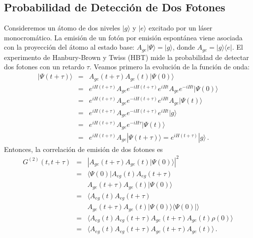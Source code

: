 \documentclass[twocolumn,aps,eqsecnum,showkeys,amsmath]{revtex4}
\begin{document}
\subsection{Probabilidad de Detecci\'on de Dos Fotones} %
Consideremos un \'atomo de dos niveles $|g\rangle$ y $|e\rangle$ 
excitado por un l\'aser monocrom\'atico. La emisi\'on de un fot\'on por 
emisi\'on espont\'anea viene asociada con la proyecci\'on del \'atomo al 
estado base: $A_{ge} |\Psi \rangle =|g\rangle$, donde 
$A_{ge} = |g \rangle \langle e|$. El experimento de Hanbury-Brown y 
Twiss (HBT) mide la probabilidad de detectar dos fotones con un retardo 
$\tau$. Veamos primero la evoluci\'on de la funci\'on de onda: 
%
\begin{eqnarray*}  	%
|\Psi(t+\tau) \rangle &=& A_{ge} (t+\tau) A_{ge} (t) |\Psi (0) \rangle  	\\
	&=& e^{iH(t+\tau)} A_{ge} e^{-iH(t+\tau)} e^{iHt} A_{ge} e^{-iHt} 
		|\Psi (0) \rangle \\ 
&=& e^{iH(t+\tau)} A_{ge} e^{-iH(t+\tau)} e^{iHt} A_{ge} |\Psi (t) \rangle \\ 
&=& e^{iH(t+\tau)} A_{ge} e^{-iH(t+\tau)} e^{iHt} |g \rangle \\ 
&=& e^{iH(t+\tau)} A_{ge} e^{-iH\tau}  |\Psi(t) \rangle \\ 
&=& e^{iH(t+\tau)} A_{ge} |\Psi(t+\tau) \rangle 
	= e^{iH(t+\tau)} |g \rangle \,.
\end{eqnarray*} 	
Entonces, la correlaci\'on de emisi\'on de dos fotones es 
%
\begin{eqnarray*}  	\label{ec:G2operacional}
G^{(2)} (t,t+\tau) &=& \left| A_{ge} (t+\tau) A_{ge} (t) |\Psi (0) \rangle  \right|^2 	
	\nonumber \\ 
&=& \langle \Psi(0) | A_{eg} (t) A_{eg} (t+\tau)  \\ 
	&& A_{ge} (t+\tau) A_{ge} (t) |\Psi(0) \rangle \\
&=& \langle  A_{eg} (t) A_{eg} (t+\tau)  \\ 
	&& A_{ge} (t+\tau) A_{ge} (t) |\Psi(0) \rangle \langle \Psi(0) |  \rangle \\
&=& \langle  A_{eg} (t) A_{eg} (t+\tau)  A_{ge} (t+\tau) A_{ge} (t)\rho(0) \rangle \\
&=& \langle  A_{eg} (t) A_{eg} (t+\tau)  A_{ge} (t+\tau) A_{ge} (t) \rangle \,.
\end{eqnarray*} 	
\end{document}
